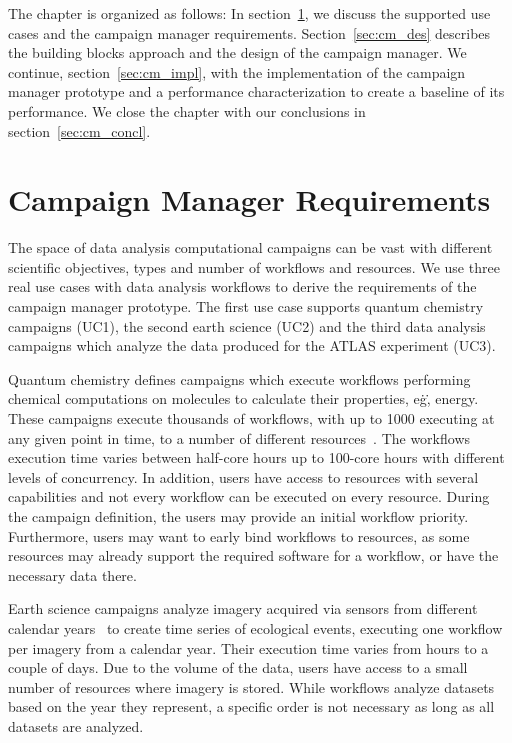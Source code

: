 The chapter is organized as follows:
In section~\ref{sec:cm_req}, we discuss the supported use cases and the campaign manager requirements.
Section~\ref{sec:cm_des} describes the building blocks approach and the design of the campaign manager.
We continue, section~\ref{sec:cm_impl}, with the implementation of the campaign manager prototype and a performance characterization to create a baseline of its performance.
We close the chapter with our conclusions in section~\ref{sec:cm_concl}.

\section{Campaign Manager Requirements}
\label{sec:cm_req}

The space of data analysis computational campaigns can be vast with different scientific objectives, types and number of workflows and resources.
We use three real use cases with data analysis workflows to derive the requirements of the campaign manager prototype.
The first use case supports quantum chemistry campaigns (UC1), the second earth science (UC2) and the third data analysis campaigns which analyze the data produced for the ATLAS experiment (UC3).

Quantum chemistry defines campaigns which execute workflows performing chemical computations on molecules to calculate their properties, e\.g\., energy.
These campaigns execute thousands of workflows, with up to 1000 executing at any given point in time, to a number of different resources~\cite{smith2020molssi}.
The workflows execution time varies between half-core hours up to 100-core hours with different levels of concurrency.
In addition, users have access to resources with several capabilities and not every workflow can be executed on every resource.
During the campaign definition, the users may provide an initial workflow priority.
Furthermore, users may want to early bind workflows to resources, as some resources may already support the required software for a workflow, or have the necessary data there.

Earth science campaigns analyze imagery acquired via sensors from different calendar years~\cite{paraskevakos2019workflow} to create time series of ecological events, executing one workflow per imagery from a calendar year.
Their execution time varies from hours to a couple of days.
Due to the volume of the data, users have access to a small number of resources where imagery is stored.
While workflows analyze datasets based on the year they represent, a specific order is not necessary as long as all datasets are analyzed.

